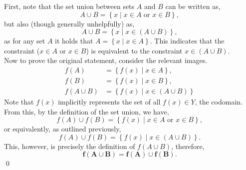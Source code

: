\documentclass{amsart}
\begin{document}
First, note that the set union between sets $A$ and $B$ can be written as,
$$
A\cup B = \left\{x \mid x\in A\textrm{ or }x\in B\right\},
$$
but also (though generally unhelpfully) as,
$$
A\cup B = \left\{x \mid x\in (A\cup B) \right\},
$$
as for any set $A$ it holds that $A = \left\{x \mid x\in A\right\}$.
This indicates that the constraint ($x\in A\textrm{ or }x\in B$) is equivalent to the constraint $x\in (A\cup B)$.\\
Now to prove the original statement, consider the relevant images.
\begin{align*}
    f(A) &= \left\{f(x) \mid x\in A \right\},\\
    f(B) &= \left\{f(x) \mid x\in B \right\},\\
    f(A\cup B) &= \left\{f(x) \mid x\in (A\cup B) \right\}
\end{align*}
Note that $f(x)$ implicitly represents the set of all $f(x)\in Y$, the codomain.\\
From this, by the definition of the set union, we have,
$$
f(A)\cup f(B) = \left\{f(x) \mid x\in A\textrm{ or }x\in B \right\},
$$
or equivalently, as outlined previously,
$$
f(A)\cup f(B) = \left\{f(x) \mid x\in (A\cup B) \right\}.
$$
This, however, is precisely the definition of $f(A\cup B)$, therefore,
$$
\mathbf{f(A\cup B) = f(A)\cup f(B)}.
$$\qed
\end{document}
